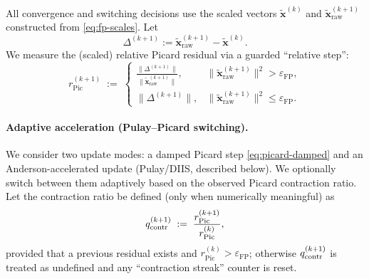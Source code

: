 
All convergence and switching decisions use the scaled vectors $\widetilde{\mathbf{x}}^{(k)}$ and $\widetilde{\mathbf{x}}_{\mathrm{raw}}^{(k+1)}$ constructed from \eqref{eq:fp-scales}. Let
\[
\Delta^{(k+1)} := \widetilde{\mathbf{x}}_{\mathrm{raw}}^{(k+1)}-\widetilde{\mathbf{x}}^{(k)}.
\]
We measure the (scaled) relative Picard residual via a guarded ``relative step'':
\begin{equation}\label{eq:fp-picard-res}
r_{\mathrm{Pic}}^{(k+1)} \;:=\;
\begin{cases}
\displaystyle \frac{\|\Delta^{(k+1)}\|}{\|\widetilde{\mathbf{x}}_{\mathrm{raw}}^{(k+1)}\|}, & \|\widetilde{\mathbf{x}}_{\mathrm{raw}}^{(k+1)}\|^2>\varepsilon_{\mathrm{FP}},\\[1.2ex]
\displaystyle \|\Delta^{(k+1)}\|, & \|\widetilde{\mathbf{x}}_{\mathrm{raw}}^{(k+1)}\|^2\le \varepsilon_{\mathrm{FP}}.
\end{cases}
\end{equation}

\paragraph{Adaptive acceleration (Pulay--Picard switching).}
We consider two update modes: a damped Picard step \eqref{eq:picard-damped} and an Anderson-accelerated update (Pulay/DIIS, described below). We optionally switch between them adaptively based on the observed Picard contraction ratio.
Let the contraction ratio be defined (only when numerically meaningful) as
\begin{equation}\label{eq:fp-contraction}
q_{\mathrm{contr}}^{(k+1)} \;:=\; \frac{r_{\mathrm{Pic}}^{(k+1)}}{r_{\mathrm{Pic}}^{(k)}},
\end{equation}
provided that a previous residual exists and $r_{\mathrm{Pic}}^{(k)}>\varepsilon_{\mathrm{FP}}$; otherwise $q_{\mathrm{contr}}^{(k+1)}$ is treated as undefined and any ``contraction streak'' counter is reset.

